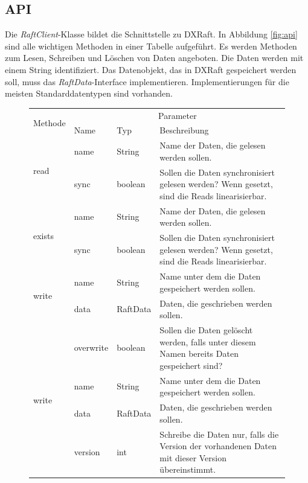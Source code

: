 \subsection{API}
\label{api}

Die \textit{RaftClient}-Klasse bildet die Schnittstelle zu DXRaft. In Abbildung \ref{fig:api} sind alle wichtigen Methoden in einer Tabelle aufgeführt. Es werden Methoden zum Lesen, Schreiben und Löschen von Daten angeboten. Die Daten werden mit einem String identifiziert. Das Datenobjekt, das in DXRaft gespeichert werden soll, muss das \textit{RaftData}-Interface implementieren. Implementierungen für die meisten Standarddatentypen sind vorhanden. 

\begin{figure}[t]
	\footnotesize
	\begin{tabular}{ | l | l | p{} | p{} |}	
		\hline
		\multirow{2}{*}{Methode} & \multicolumn{3}{|c|}{Parameter}  \\ \cline{2-4}
		& Name & Typ & Beschreibung \\ \hline
		
		\multirow{2}{*}{read} & name & String & Name der Daten, die gelesen werden sollen. \\
		& sync & boolean & Sollen die Daten synchronisiert gelesen werden? Wenn gesetzt, sind die Reads linearisierbar.\\\hline
		
		\multirow{2}{*}{exists} & name & String & Name der Daten, die gelesen werden sollen. \\
		& sync & boolean & Sollen die Daten synchronisiert gelesen werden? Wenn gesetzt, sind die Reads linearisierbar.\\ \hline
		
		\multirow{2}{*}{write} & name & String & Name unter dem die Daten gespeichert werden sollen. \\
		& data & RaftData & Daten, die geschrieben werden sollen. \\ 
		& overwrite & boolean & Sollen die Daten gelöscht werden, falls unter diesem Namen bereits Daten gespeichert sind? \\\hline
		
		\multirow{2}{*}{write} & name & String & Name unter dem die Daten gespeichert werden sollen. \\
		& data & RaftData & Daten, die geschrieben werden sollen. \\ 
		& version & int & Schreibe die Daten nur, falls die Version der vorhandenen Daten mit dieser Version übereinstimmt.\\\hline
		

\end{tabular}
\end{figure}
